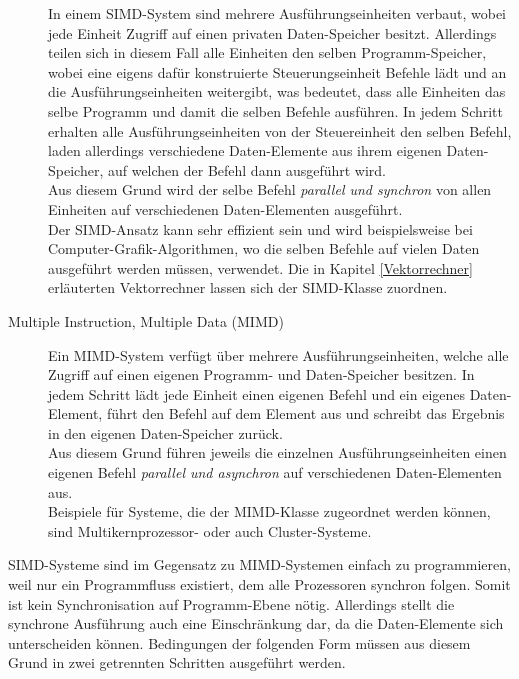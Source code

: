 \begin{description}
						In einem SIMD-System sind mehrere Ausführungseinheiten verbaut, wobei jede Einheit Zugriff auf einen privaten Daten-Speicher besitzt. Allerdings teilen sich in diesem Fall alle Einheiten den selben Programm-Speicher, wobei eine eigens dafür konstruierte Steuerungseinheit Befehle lädt und an die Ausführungseinheiten weitergibt, was bedeutet, dass alle Einheiten das selbe Programm und damit die selben Befehle ausführen. In jedem Schritt erhalten alle Ausführungseinheiten von der Steuereinheit den selben Befehl, laden allerdings verschiedene Daten-Elemente aus ihrem eigenen Daten-Speicher, auf welchen der Befehl dann ausgeführt wird.\\
						Aus diesem Grund wird der selbe Befehl \textit{parallel und synchron} von allen Einheiten auf verschiedenen Daten-Elementen ausgeführt.\\
						Der SIMD-Ansatz kann sehr effizient sein und wird beispielsweise bei Computer-Grafik-Algorithmen, wo die selben Befehle auf vielen Daten ausgeführt werden müssen, verwendet. Die in Kapitel \ref{Vektorrechner} erläuterten Vektorrechner lassen sich der SIMD-Klasse zuordnen. \cite{ParaProgRauber} \cite{FlynnscheKlassifikationWikipedia} \cite{EntwicklungParallelerProgramme}
						
					\item [Multiple Instruction, Multiple Data (MIMD)]
					
						Ein MIMD-System verfügt über mehrere Ausführungseinheiten, welche alle Zugriff auf einen eigenen Programm- und Daten-Speicher besitzen. In jedem Schritt lädt jede Einheit einen eigenen Befehl und ein eigenes Daten-Element, führt den Befehl auf dem Element aus und schreibt das Ergebnis in den eigenen Daten-Speicher zurück.\\
						Aus diesem Grund führen jeweils die einzelnen Ausführungseinheiten einen eigenen Befehl \textit{parallel und asynchron} auf verschiedenen Daten-Elementen aus.\\
						Beispiele für Systeme, die der MIMD-Klasse zugeordnet werden können, sind Multikernprozessor- oder auch Cluster-Systeme. \cite{ParaProgRauber} \cite{FlynnscheKlassifikationWikipedia} \cite{EntwicklungParallelerProgramme}
						
				\end{description}
			
				SIMD-Systeme sind im Gegensatz zu MIMD-Systemen einfach zu programmieren, weil nur ein Programmfluss existiert, dem alle Prozessoren synchron folgen. Somit ist kein Synchronisation auf Programm-Ebene nötig. Allerdings stellt die synchrone Ausführung auch eine Einschränkung dar, da die Daten-Elemente sich unterscheiden können. Bedingungen der folgenden Form müssen aus diesem Grund in zwei getrennten Schritten ausgeführt werden.
				
